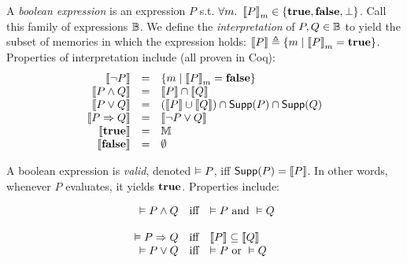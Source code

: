\documentclass[10pt]{article}
\theoremstyle{definition}
\begin{document}
A \emph{boolean expression} is an expression $P$ s.t.
$\forall m.\ \Eval(P,m) \in \set{\True,\False,\bot}$.
Call this family of expressions $\BoolExps$.
%
We define the \emph{interpretation} of $P,Q \in \BoolExps$
to yield the subset of memories
in which the expression holds:
$\Interp P \triangleq \SetBuild(m | {\Eval(P,m) = \True})$.
Properties of interpretation include (all proven in Coq):
\begin{displaymath}
\begin{array}{rcl}
\Interp{\neg P} & = & \SetBuild(m | {\Eval(P,m) = \False}) \\
\Interp{P \wedge Q} & = & \Interp{P} \cap \Interp{Q} \\
\Interp{P \vee Q} & = & (\Interp{P} \cup \Interp{Q}) \cap \Support P \cap \Support Q \\
\Interp{P \Rightarrow Q} & = & \Interp{\neg P \vee Q} \\
\Interp{\ETrue} & = & \Mems  \\
\Interp{\EFalse} & = & \emptyset \\
\end{array}
\end{displaymath}

A boolean expression is \emph{valid},
denoted $\VAL P$,
iff $\Support P = \Interp P$.
In other words, whenever $P$ evaluates,
it yields $\True$.
Properties include:
{

\newcommand*{\LINE}[2]{%
    \VAL #1 & \text{iff} & #2 \\
}

\begin{mathpar}
\end{mathpar}

\begin{displaymath}
\begin{array}{rcl}
\LINE {P \wedge Q}{\VAL P \text{ and } \VAL Q} \\
\LINE {P \Rightarrow Q}{\Interp P \subseteq \Interp Q}
\LINE {P \vee Q}{\VAL P \text{ or } \VAL Q}
\end{array}
\end{displaymath}

}
\end{document}
